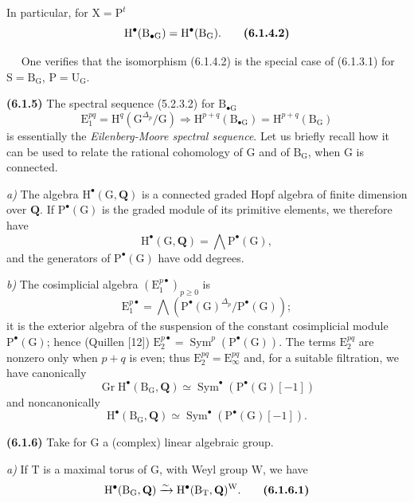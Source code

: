 \documentclass[11pt,leqno]{article}
\newcommand{\Page}[1]{\ifvmode\noindent\else\unskip\ \fi{\footnotesize\textcolor{gray}{[p.\,#1]}}\ \ignorespaces}
\begin{document}
In particular, for \(\mathrm{X}=\mathrm{P}^{t}\)
\[
\mathrm{H}^{\bullet}(\mathrm{B}_{\bullet\mathrm{G}})
=\mathrm{H}^{\bullet}(\mathrm{B}_{\mathrm{G}}).
\tag*{\textbf{(6.1.4.2)}}
\]

\Page{18}
One verifies that the isomorphism (6.1.4.2) is the special case of (6.1.3.1) for \(\mathrm{S}=\mathrm{B}_{\mathrm{G}}\), \(\mathrm{P}=\mathrm{U}_{\mathrm{G}}\).

\textbf{(6.1.5)} The spectral sequence (5.2.3.2) for \(\mathrm{B}_{\bullet\mathrm{G}}\)
\[
\mathrm{E}_{1}^{pq}=\mathrm{H}^{q}(\mathrm{G}^{\Delta_p}/\mathrm{G})
\Rightarrow
\mathrm{H}^{p+q}(\mathrm{B}_{\bullet\mathrm{G}})
=\mathrm{H}^{p+q}(\mathrm{B}_{\mathrm{G}})
\]
is essentially the \textit{Eilenberg-Moore spectral sequence}. Let us briefly recall how it can be used to relate the rational cohomology of \(\mathrm{G}\) and of \(\mathrm{B}_{\mathrm{G}}\), when \(\mathrm{G}\) is connected.

\textit{a)} The algebra \(\mathrm{H}^{\bullet}(\mathrm{G},\mathbf{Q})\) is a connected graded Hopf algebra of finite dimension over \(\mathbf{Q}\). If \(\mathrm{P}^{\bullet}(\mathrm{G})\) is the graded module of its primitive elements, we therefore have
\[
\mathrm{H}^{\bullet}(\mathrm{G},\mathbf{Q})
=\mathop{\textstyle\bigwedge}\mathrm{P}^{\bullet}(\mathrm{G}),
\]
and the generators of \(\mathrm{P}^{\bullet}(\mathrm{G})\) have odd degrees.

\textit{b)} The cosimplicial algebra \((\mathrm{E}_{1}^{p\bullet})_{p\geq 0}\) is
\[
\mathrm{E}_{1}^{p\bullet}
=\mathop{\textstyle\bigwedge}
(\mathrm{P}^{\bullet}(\mathrm{G})^{\Delta_p}/\mathrm{P}^{\bullet}(\mathrm{G}));
\]
it is the exterior algebra of the suspension of the constant cosimplicial module \(\mathrm{P}^{\bullet}(\mathrm{G})\); hence (Quillen [12]) \(\mathrm{E}_{2}^{p\bullet}=\operatorname{Sym}^{p}(\mathrm{P}^{\bullet}(\mathrm{G}))\). The terms \(\mathrm{E}_{2}^{pq}\) are nonzero only when \(p+q\) is even; thus \(\mathrm{E}_{2}^{pq}=\mathrm{E}_{\infty}^{pq}\) and, for a suitable filtration, we have canonically
\[
\operatorname{Gr}\mathrm{H}^{\bullet}(\mathrm{B}_{\mathrm{G}},\mathbf{Q})
\simeq\operatorname{Sym}^{\bullet}(\mathrm{P}^{\bullet}(\mathrm{G})[-1])
\]
and noncanonically
\[
\mathrm{H}^{\bullet}(\mathrm{B}_{\mathrm{G}},\mathbf{Q})
\simeq\operatorname{Sym}^{\bullet}(\mathrm{P}^{\bullet}(\mathrm{G})[-1]).
\]

\textbf{(6.1.6)} Take for \(\mathrm{G}\) a (complex) linear algebraic group.

\textit{a)} If \(\mathrm{T}\) is a maximal torus of \(\mathrm{G}\), with Weyl group \(\mathrm{W}\), we have
\[
\mathrm{H}^{\bullet}(\mathrm{B}_{\mathrm{G}},\mathbf{Q})
\xrightarrow{\sim}
\mathrm{H}^{\bullet}(\mathrm{B}_{\mathrm{T}},\mathbf{Q})^{\mathrm{W}}.
\tag*{\textbf{(6.1.6.1)}}
\]
\end{document}
